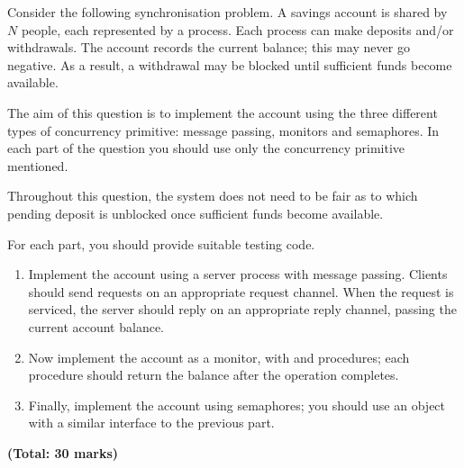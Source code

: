 \begin{question}
Consider the following synchronisation problem.  A savings account is shared
by $N$ people, each represented by a process.  Each process can make
deposits and/or withdrawals.  The account records the current balance; this
may never go negative.  As a result, a withdrawal may be blocked until
sufficient funds become available.  

The aim of this question is to implement the account using the three different
types of concurrency primitive: message passing, monitors and semaphores.  In
each part of the question you should use only the concurrency primitive
mentioned. 

Throughout this question, the system does not need to be fair as to which
pending deposit is unblocked once sufficient funds become available.

For each part, you should provide suitable testing code.


\begin{enumerate}
\item
Implement the account using a server process with message passing.  Clients
should send requests on an appropriate request channel.  When the request is
serviced, the server should reply on an appropriate reply channel, passing the
current account balance.


\item
Now implement the account as a monitor, with  and 
procedures; each procedure should return the balance after the operation
completes. 
%


\item
Finally, implement the account using semaphores; you should use an object with
a similar interface to the previous part.
%
%
\end{enumerate}
{\bf(Total: 30 marks)}
\end{question}

